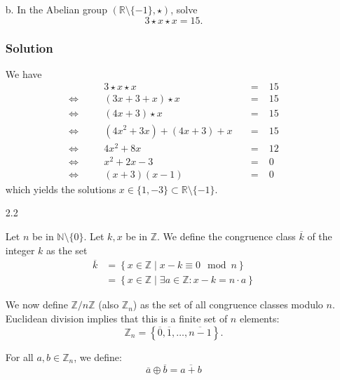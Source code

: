 \documentclass[11pt]{article}
\newcommand{\R}{\mathbb{R}}
\newcommand{\Z}{\mathbb{Z}}
\newcommand{\N}{\mathbb{N}}
\newcommand{\set}[1]{\left\{#1\right\}}                  %
\newcommand{\tuple}[1]{\left(#1\right)}                  %
\newcommand{\cls}[1]{\overline{#1}}                      %
\theoremstyle{definition}
\theoremstyle{plain}
\theoremstyle{remark}
\begin{document}
\begin{enumerate}
    \item[b.] In the Abelian group $\tuple{ \R \setminus \{-1\}, \star }$, solve
          \[
              3 \star x \star x = 15.
          \]

          \subsubsection*{Solution}

          We have
          \[
              \begin{alignedat}{3}
                            &  & 3 \star x \star x          &  & \; = \; & 15 \\
                  \iff\quad &  & (3x + 3 + x) \star x       &  & \; =\;  & 15 \\
                  \iff\quad &  & (4x + 3) \star x           &  & \; =\;  & 15 \\
                  \iff\quad &  & (4x^2 + 3x) + (4x + 3) + x &  & \; =\;  & 15 \\
                  \iff\quad &  & 4x^2 + 8x                  &  & \; =\;  & 12 \\
                  \iff\quad &  & x^2 + 2x -3                &  & \; =\;  & 0  \\
                  \iff\quad &  & (x + 3) (x - 1)            &  & \; =\;  & 0
              \end{alignedat}
          \]
          which yields the solutions $x \in \{1, -3\} \subset \R \setminus \{-1\}$.

    \item[2.2]

          Let $n$ be in $\N \setminus \{0\}$. Let $k, x$ be in $\Z$. We define the congruence class $\cls{k}$ of the
          integer $k$ as the set
          \[
              \begin{aligned}
                  \cls{k} & = \set{ x \in \Z \mid x - k \equiv 0 \mod n }               \\
                          & = \set{ x \in \Z \mid \exists a \in \Z: x - k = n \cdot a }
              \end{aligned}
          \]

          We now define $\Z / n\Z$ (also $\Z_n$) as the set of all congruence classes modulo $n$.
          Euclidean division implies that this is a finite set of $n$ elements:
          \[
              \Z_n = \set{ \cls{0}, \cls{1}, \ldots, \cls{n - 1} }.
          \]

          For all $a, b \in \Z_n$, we define:
          \[
              \cls{a} \oplus \cls{b} = \cls{a + b}
          \]


\end{enumerate}
\end{document}
